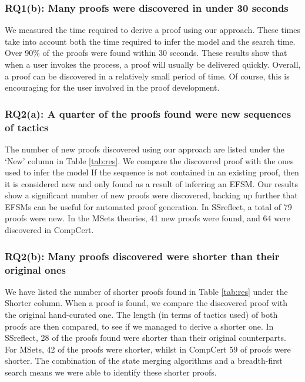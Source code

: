 \documentclass{llncs}
\begin{document}
\vspace{-3mm}

\subsubsection{RQ1(b): Many proofs were discovered in under 30 seconds}
We measured the time required to derive a proof using our approach. These times take into account both the time required to infer the model and the search time. Over 90\% of the proofs were found within 30 seconds. These results show that when a user invokes the process, a proof will usually be delivered quickly. Overall, a proof can be discovered in a relatively small period of time. Of course, this is encouraging for the user involved in the proof development.

\vspace{-3mm}

\subsubsection{RQ2(a): A quarter of the proofs found were new sequences of tactics}
The number of new proofs discovered using our approach are listed under the `New' column in Table \ref{tab:res}. We compare the discovered proof with the ones used to infer the model If the sequence is not contained in an existing proof, then it is considered new and only found as a result of inferring an EFSM. Our results show a significant number of new proofs were discovered, backing up further that EFSMs can be useful for automated proof generation. In SSreflect, a total of 79 proofs were new. In the MSets theories, 41 new proofs were found, and 64 were discovered in CompCert.

\vspace{-3mm}

\subsubsection{RQ2(b): Many proofs discovered were shorter than their original ones}
We have listed the number of shorter proofs found in Table \ref{tab:res} under the Shorter column. When a proof is found, we compare the discovered proof with the original hand-curated one. The length (in terms of tactics used) of both proofs are then compared, to see if we managed to derive a shorter one. In SSreflect, 28 of the proofs found were shorter than their original counterparts. For MSets, 42 of the proofs were shorter, whilst in CompCert 59 of proofs were shorter. The combination of the state merging algorithms and a breadth-first search means we were able to identify these shorter proofs.
\end{document}
